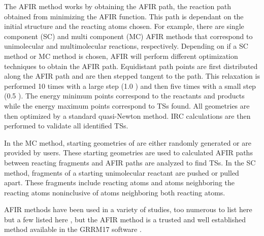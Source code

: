 \documentclass[preprint, 11pt]{elsarticle} %
\begin{document}
The AFIR method works by obtaining the AFIR path, the reaction path obtained from minimizing the AFIR function.
This path is dependant on the initial structure and the reacting atoms chosen. 
For example, there are single component (SC) and multi component (MC) AFIR methods that correspond to unimolecular and multimolecular reactions, respectively.
Depending on if a SC method or MC method is chosen, AFIR will perform different optimization techniques to obtain the AFIR path. 
Equidistant path points are first distributed along the AFIR path and are then stepped tangent to the path.
This relaxation is performed 10 times with a large step (1.0 \angstrom) and then five times with a small step (0.5 \angstrom). 
The energy minimum points correspond to the reactants and products while the energy maximum points correspond to TSs found. 
All geometries are then optimized by a standard quasi-Newton method.
IRC calculations are then performed to validate all identified TSs.

In the MC method, starting geometries of  are either randomly generated or are provided by users.
These starting geometries are used to calculated AFIR paths between reacting fragments and AFIR paths are analyzed to find TSs.
In the SC method, fragments of a starting unimolecular reactant are pushed or pulled apart. 
These fragments include reacting atoms and atoms neighboring the reacting atoms noninclusive of atoms neighboring both reacting atoms.

AFIR methods have been used in a variety of studies, too numerous to list here but a few listed here \cite{Maeda:2016, Madea:2018}, but the AFIR method is a trusted and well established method available in the GRRM17 software \cite{Madea:2013}.


\end{document}

